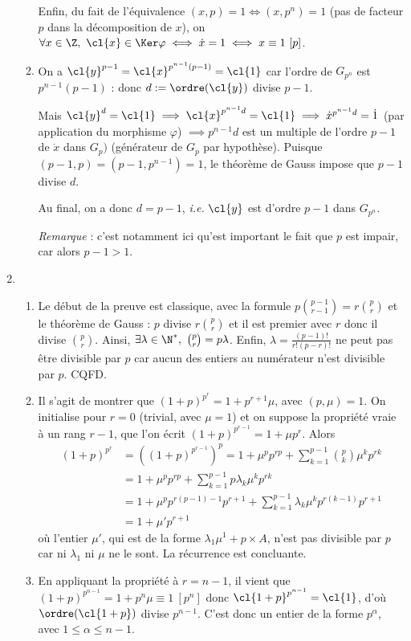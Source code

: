 \begin{enumerate}
\begin{enumerate}
 Enfin, du fait de l'équivalence $(x,p) = 1 \iff (x, p^n) = 1$ (pas de facteur $p$ dans la décomposition de $x$), on  $\forall x\in \Z,~ \cl{x} \in \Ker \varphi \iff \dot{x} = 1 \iff x \equiv 1~ [p]$.

 \item On a $\cl{y}^{p-1} = \cl{x}^{p^{n-1}(p-1)} = \cl{1}$ car l'ordre de $G_{p^n}$ est $p^{n-1}(p-1)$ : donc $d:=\ordre(\cl{y})$ divise $p-1$.

 Mais $\cl{y}^{d} = \cl{1} \implies \cl{x}^{p^{n-1}d} = \cl{1} \implies \dot{x}^{p^{n-1}d} = \dot{1}$ (par application du morphisme $\varphi$) $\implies p^{n-1}d$ est un multiple de l'ordre $p-1$ de $\dot{x}$ dans $G_p)$ (générateur de $G_p$ par hypothèse). Puisque $(p-1, p) = (p-1, p^{n-1}) = 1$, le théorème de Gauss impose que $p-1$ divise $d$.

 Au final, on a donc $d= p-1$, \textit{i.e.} $\cl{y}$ est d'ordre $p-1$ dans $G_{p^n}$.

 \textit{Remarque} : c'est notamment ici qu'est important le fait que $p$ est impair, car alors $p-1>1$.
\end{enumerate}
\item \begin{enumerate}
       \item Le début de la preuve est classique, avec la formule $p\binom{p-1}{r-1} = r\binom{p}{r}$ et le théorème de Gauss : $p$ divise $r\binom{p}{r}$ et il est premier avec $r$ donc il divise $\binom{p}{r}$. Ainsi, $\exists \lambda \in \N^*,~ \binom{p}{r} = p\lambda$.
       Enfin, $\lambda = \frac{(p-1)!}{r!(p-r)!}$ ne peut pas être divisible par $p$ car aucun des entiers au numérateur n'est divisible par $p$. CQFD.

       \item Il s'agit de montrer que $(1+p)^{p^r} = 1 + p^{r+1}\mu$, avec $(p,\mu) = 1$. On initialise pour $r=0$ (trivial, avec $\mu =1$) et on suppose la propriété vraie à un rang $r-1$, que l'on écrit $(1+p)^{p^{r-1}} = 1 + \mu p^r$. Alors
       \begin{align*}
        (1+p)^{p^r} &= \left((1+p)^{p^{r-1}} \right)^p = 1+ \mu^p p^{rp} + \sum\limits_{k=1}^{p-1} \binom{p}{k} \mu^k p^{rk}\\
        & = 1+ \mu^p p^{rp} + \sum\limits_{k=1}^{p-1} p \lambda_k \mu^k p^{rk} \\
        & = 1+ \mu^p p^{r(p-1)-1} p^{r+1} + \sum\limits_{k=1}^{p-1} \lambda_k \mu^k p^{r(k-1)}p^{r+1}\\
        & = 1 + \mu' p^{r+1}
       \end{align*}
où l'entier $\mu'$, qui est de la forme $\lambda_1 \mu^1 + p\times A$, n'est pas divisible par $p$ car ni $\lambda_1$ ni $\mu$ ne le sont. La récurrence est concluante.
\item En appliquant la propriété à $r=n-1$, il vient que $(1+p)^{p^{n-1}} = 1+ p^n\mu \equiv 1~ [p^n]$ donc $\cl{1+p}^{p^{n-1}} = \cl{1}$, d'où $\ordre(\cl{1+p})$ divise $p^{n-1}$. C'est donc un entier de la forme $p^{\alpha}$, avec $1\leqslant \alpha \leqslant n-1$.


\end{enumerate}
\end{enumerate}

